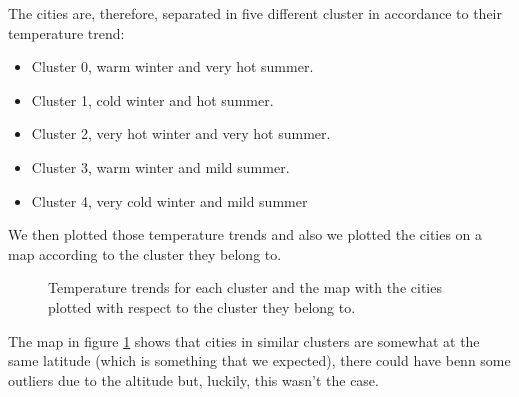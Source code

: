 The cities are, therefore, separated in five different cluster in accordance to their temperature trend:
\begin{itemize}
    \item Cluster 0, warm winter and very hot summer.
    \item Cluster 1, cold winter and hot summer.
    \item Cluster 2, very hot winter and very hot summer.
    \item Cluster 3, warm winter and mild summer.
    \item Cluster 4, very cold winter and mild summer
\end{itemize}
We then plotted those temperature trends and also we plotted the cities on a map according to the cluster they belong to.
\begin{figure}[H]
    \centering
    \caption{Temperature trends for each cluster and the map with the cities plotted with respect to the cluster they belong to.}
    \label{fig:timeseries_plot_map}
\end{figure}
The map in figure \ref{fig:timeseries_plot_map} shows that cities in similar clusters are somewhat at the same latitude (which is something that we expected), there could have benn some outliers due to the altitude but, luckily, this wasn't the case.